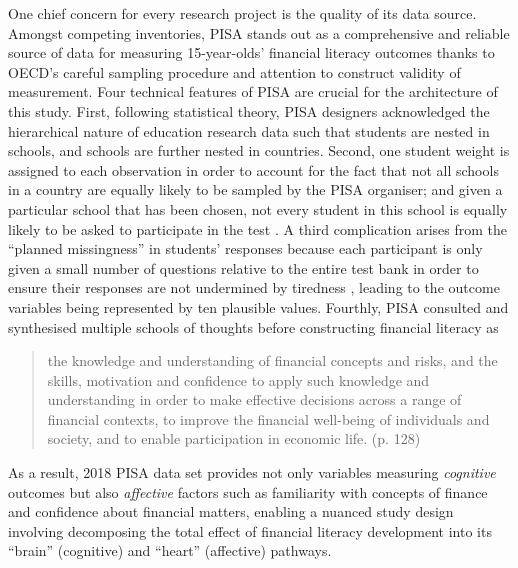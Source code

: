 \documentclass[a4paper,11pt,UKenglish,twoside,openright]{report}\usepackage[]{graphicx}\usepackage[]{color}
\begin{document}
One chief concern for every research project is the quality of its data source. Amongst competing inventories, PISA stands out as a comprehensive and reliable source of data for measuring 15-year-olds' financial literacy outcomes thanks to OECD's careful sampling procedure and attention to construct validity of measurement. Four technical features of PISA are crucial for the architecture of this study. First, following statistical theory, PISA designers acknowledged the hierarchical nature of education research data such that students are nested in schools, and schools are further nested in countries. Second, one student weight is assigned to each observation in order to account for the fact that not all schools in a country are equally likely to be sampled by the PISA organiser; and given a particular school that has been chosen, not every student in this school is equally likely to be asked to participate in the test \parencite{rust:2014}. A third complication arises from the ``planned missingness'' in students' responses because each participant is only given a small number of questions relative to the entire test bank in order to ensure their responses are not undermined by tiredness \parencite{vondavier:2014}, leading to the outcome variables being represented by ten plausible values. Fourthly, PISA consulted and synthesised multiple schools of thoughts \parencite{PISAframework} before constructing financial literacy as \blockquote{the knowledge and understanding of financial concepts and risks, and the skills, motivation and confidence to apply such knowledge and understanding in order to make effective decisions across a range of financial contexts, to improve the financial well-being of individuals and society, and to enable participation in economic life. (p. 128)} As a result, 2018 PISA data set \parencite{FLdata} provides not only variables measuring \emph{cognitive} outcomes but also \emph{affective} factors such as familiarity with concepts of finance and confidence about financial matters, enabling a nuanced study design involving decomposing the total effect of financial literacy development into its ``brain'' (cognitive) and ``heart'' (affective) pathways.
\end{document}
